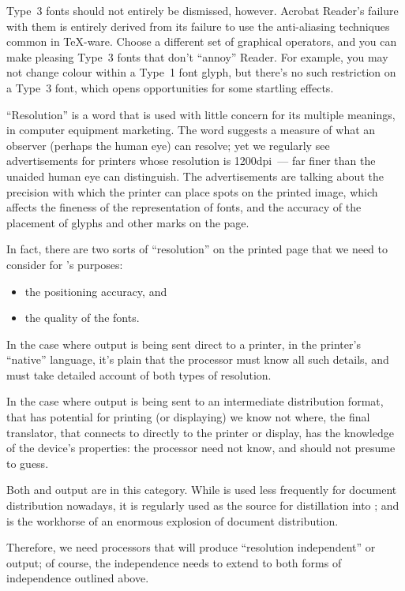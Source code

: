 Type~3 fonts should not entirely be dismissed, however.  Acrobat
Reader's failure with them is entirely derived from its failure to use
the anti-aliasing techniques common in \TeX{}-ware.  Choose a
different set of \PS{} graphical operators, and you can make pleasing
Type~3 fonts that don't ``annoy'' Reader.  For example, you may not
change colour within a Type~1 font glyph, but there's no such
restriction on a Type~3 font, which opens opportunities for some
startling effects.


``Resolution'' is a word that is used with little concern for its
multiple meanings, in computer equipment marketing.  The word suggests
a measure of what an observer (perhaps the human eye) can resolve; yet
we regularly see advertisements for printers whose resolution is
1200dpi~--- far finer than the unaided human eye can distinguish.  The
advertisements are talking about the precision with which the printer
can place spots on the printed image, which affects the fineness of
the representation of fonts, and the accuracy of the placement of
glyphs and other marks on the page.

In fact, there are two sorts of ``resolution'' on the printed page
that we need to consider for \AllTeX{}'s purposes:
\begin{itemize}
\item the positioning accuracy, and
\item the quality of the fonts.
\end{itemize}
In the case where \AllTeX{} output is being sent direct to a printer,
in the printer's ``native'' language, it's plain that the 
processor must know all such details, and must take detailed account
of both types of resolution.

In the case where output is being sent to an intermediate distribution
format, that has potential for printing (or displaying) we know not
where, the final translator, that connects to directly to the printer
or display, has the knowledge of the device's properties: the
 processor need not know, and should not presume to guess.

Both \PS{} and  output are in this category.  While \PS{} is
used less frequently for document distribution nowadays, it is
regularly used as the source for distillation into ; and
 is the workhorse of an enormous explosion of document
distribution.

Therefore, we need  processors that will produce
``resolution independent'' \PS{} or  output; of course, the
independence needs to extend to both forms of independence outlined
above.

